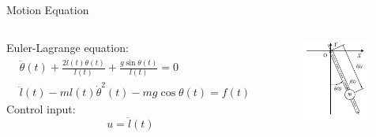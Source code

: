 \documentclass[10pt]{beamer}
\begin{document}
  \begin{frame}{Motion Equation}
    \begin{columns}[c,onlytextwidth]
        Euler-Lagrange equation:
        \begin{align*}
					&\ddot{\theta}(t)+\frac{2\dot{l}(t)\dot{\theta}(t)}{l(t)}+
						\frac{g\sin\theta(t)}{l(t)} = 0  \\
					&\ddot{l}(t)-ml(t)\dot{\theta}^2(t)-mg\cos\theta(t) = f(t)
				\end{align*}
				Control input:
				\begin{equation*}
					u = \ddot{l}(t)
				\end{equation*}
        \begin{figure}
          \includegraphics[width=0.96\textwidth,right]{images/vlp.png}
        \end{figure}
    \end{columns}
  \end{frame}
\end{document}
